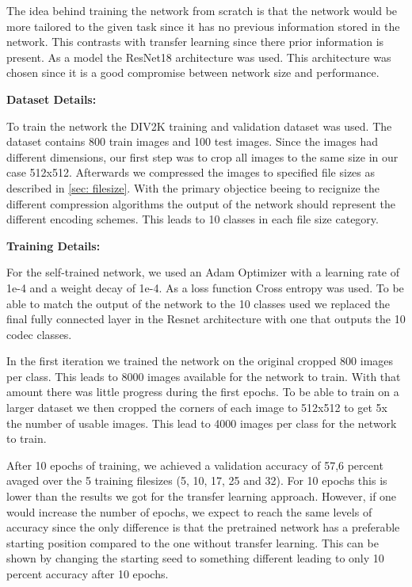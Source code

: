 The idea behind training the network from scratch is that the network would be more tailored to the given task since it has no previous information stored in the network. This contrasts with transfer learning since there prior information is present. As a model the ResNet18 architecture was used. This architecture was chosen since it is a good compromise between network size and performance.
\newline

\noindent
\textbf{Dataset Details:}

\noindent
To train the network the DIV2K training and validation dataset was used. The dataset contains 800 train images and 100 test images. Since the images had different dimensions, our first step was to crop all images to the same size in our case 512x512. Afterwards we compressed the images to specified file sizes as described in \ref{sec: filesize}. With the primary objectice beeing to recignize the different compression algorithms the output of the network should represent the different encoding schemes. This leads to 10 classes in each file size category.

\noindent
\textbf{Training Details:}

\noindent
For the self-trained network, we used an Adam Optimizer with a learning rate of 1e-4 and a weight decay of 1e-4. As a loss function Cross entropy was used. To be able to match the output of the network to the 10 classes used we replaced the final fully connected layer in the Resnet architecture with one that outputs the 10 codec classes.

\noindent
In the first iteration we trained the network on the original cropped 800 images per class. This leads to 8000 images available for the network to train. With that amount there was little progress during the first epochs. To be able to train on a larger dataset we then cropped the corners of each image to 512x512 to get 5x the number of usable images. This lead to 4000 images per class for the network to train.

\noindent
After 10 epochs of training, we achieved a validation accuracy of 57,6 percent avaged over the 5 training filesizes (5, 10, 17, 25 and 32). For 10 epochs this is lower than the results we got for the transfer learning approach. However, if one would increase the number of epochs, we expect to reach the same levels of accuracy since the only difference is that the pretrained network has a preferable starting position compared to the one without transfer learning. This can be shown by changing the starting seed to something different leading to only 10 percent accuracy after 10 epochs.

